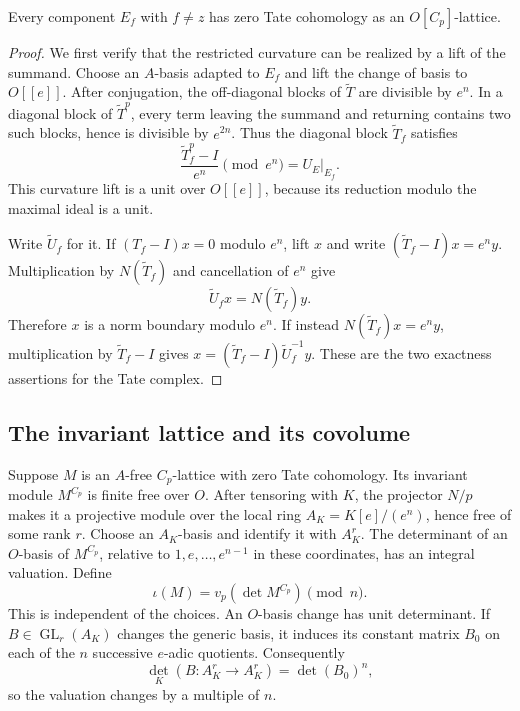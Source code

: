 \begin{lemma}\label{lem:truncation-primary-acyclic}
Every component $E_f$ with $f\ne z$ has zero Tate cohomology as an
$O[C_p]$-lattice.
\end{lemma}

\begin{proof}
We first verify that the restricted curvature can be realized by
a lift of the summand.  Choose an $A$-basis adapted to $E_f$ and
lift the change of basis to $O[[e]]$.  After conjugation, the
off-diagonal blocks of $\widetilde T$ are divisible by $e^n$.
In a diagonal block of $\widetilde T^p$, every term leaving the
summand and returning contains two such blocks, hence is divisible
by $e^{2n}$.  Thus the diagonal block $\widetilde T_f$ satisfies
\[
 \frac{\widetilde T_f^p-I}{e^n}\pmod{e^n}=U_E|_{E_f}.
\]
This curvature lift is a unit over $O[[e]]$, because its reduction
modulo the maximal ideal is a unit.

Write $\widetilde U_f$ for it.  If $(T_f-I)x=0$ modulo $e^n$,
lift $x$ and write
$(\widetilde T_f-I)x=e^ny$.  Multiplication by
$N(\widetilde T_f)$ and cancellation of $e^n$ give
\[
 \widetilde U_f x=N(\widetilde T_f)y.
\]
Therefore $x$ is a norm boundary modulo $e^n$.
If instead $N(\widetilde T_f)x=e^ny$, multiplication by
$\widetilde T_f-I$ gives
$x=(\widetilde T_f-I)\widetilde U_f^{-1}y$.
These are the two exactness assertions for the Tate complex.
\end{proof}

\subsection{The invariant lattice and its covolume}

Suppose $M$ is an $A$-free $C_p$-lattice with zero Tate cohomology.
Its invariant module $M^{C_p}$ is finite free over $O$.
After tensoring with $K$, the projector $N/p$ makes it a projective
module over the local ring $A_K=K[e]/(e^n)$, hence free of some
rank $r$.
Choose an $A_K$-basis and identify it with $A_K^r$.  The determinant
of an $O$-basis of $M^{C_p}$, relative to
$1,e,\ldots,e^{n-1}$ in these coordinates, has an integral valuation.
Define
\[
 \iota(M)=v_p(\det M^{C_p})\pmod n.
\]
This is independent of the choices.  An $O$-basis change has unit
determinant.  If $B\in\operatorname{GL}_r(A_K)$ changes the generic
basis, it induces its constant matrix $B_0$ on each of the $n$
successive $e$-adic quotients.  Consequently
\[
 \det_K(B:A_K^r\to A_K^r)=\det(B_0)^n,
\]
so the valuation changes by a multiple of $n$.

